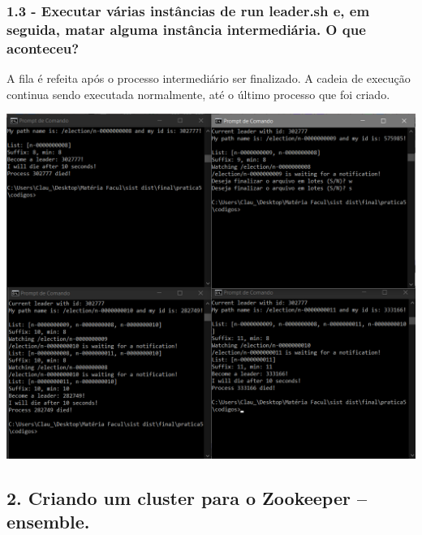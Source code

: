 \subsubsection{1.3 - Executar várias instâncias de run leader.sh e, em seguida, matar
alguma instância intermediária. O que aconteceu?}

A fila é refeita após o processo intermediário ser finalizado. A cadeia de execução continua sendo executada normalmente, até o último processo que foi criado. \newline

\begin{center}
\includegraphics[width=20cm]{pratica5/prints/roteiro 1.3.PNG}
\end{center}

\subsection*{2. Criando um cluster para o Zookeeper – ensemble.}

